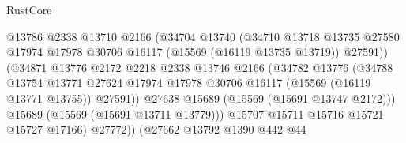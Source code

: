 \begin{lexlean}{RustCore}
\begin{coremodule}
                                        @13786
                                        @2338
                                        @13710
                                        @2166
                                        (@34704
                                          @13740
                                          (@34710
                                            @13718
                                            @13735
                                            @27580
                                            @17974
                                            @17978
                                            @30706
                                            @16117
                                            (@15569 (@16119 @13735 @13719))
                                            @27591))
                                        (@34871
                                          @13776
                                          @2172
                                          @2218
                                          @2338
                                          @13746
                                          @2166
                                          (@34782
                                            @13776
                                            (@34788
                                              @13754
                                              @13771
                                              @27624
                                              @17974
                                              @17978
                                              @30706
                                              @16117
                                              (@15569 (@16119 @13771 @13755))
                                              @27591))
                                          @27638
                                          @15689
                                          (@15569 (@15691 @13747 @2172)))
                                        @15689
                                        (@15569 (@15691 @13711 @13779)))
                                      @15707
                                      @15711
                                      @15716
                                      @15721
                                      @15727
                                      @17166)
                                    @27772))
                                (@27662
                                  @13792
                                  @1390
                                  @442
                                  @44

\end{coremodule}
\end{lexlean}
